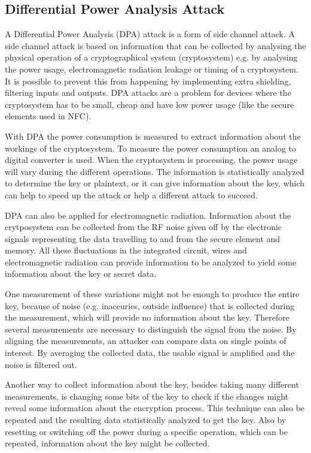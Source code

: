 \subsection{Differential Power Analysis Attack}
A Differential Power Analysis (DPA) attack is a form of side channel attack.
A side channel attack is based on information that can be collected by analysing the physical operation of a cryptographical system (cryptosystem) e.g. by analysing the power usage, electromagnetic radiation leakage or timing of a cryptosystem.
It is possible to prevent this from happening by implementing extra shielding, filtering inputs and outputs.
DPA attacks are a problem for devices where the cryptosystem has to be small, cheap and have low power usage (like the secure elements used in NFC).

With DPA the power consumption is measured to extract information about the workings of the cryptosystem.
To measure the power consumption an analog to digital converter is used.
When the cryptosystem is processing, the power usage will vary during the different operations.
The information is statistically analyzed to determine the key or plaintext, or it can give information about the key, which can help to speed up the attack or help a different attack to succeed.

DPA can also be applied for electromagnetic radiation.
Information about the crytposystem can be collected from the RF noise given off by the electronic signals representing the data travelling to and from the secure element and memory.
All these fluctuations in the integrated circuit, wires and electromagnetic radiation can provide information to be analyzed to yield some information about the key or secret data.

One measurement of these variations might not be enough to produce the entire key, because of noise (e.g. inaccuries, outside influence) that is collected during the measurement, which will provide no information about the key.
Therefore several measurements are necessary to distinguish the signal from the noise.
By aligning the measurements, an attacker can compare data on single points of interest.
By averaging the collected data, the usable signal is amplified and the noise is filtered out.

Another way to collect information about the key, besides taking many different measurements, is changing some bits of the key to check if the changes might reveal some information about the encryption process.
This technique can also be repeated and the resulting data statistically analyzed to get the key.
Also by resetting or switching off the power during a specific operation, which can be repeated, information about the key might be collected.

